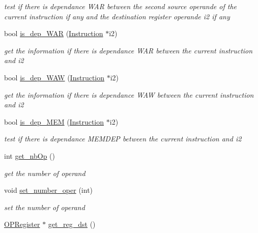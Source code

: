 \begin{DoxyCompactItemize}
\begin{DoxyCompactList}\small\item\em test if there is dependance \-W\-A\-R between the second source operande of the current instruction if any and the destination register operande i2 if any \end{DoxyCompactList}\item 
bool \hyperlink{classInstruction_ae79b239c6ab30a15064b5a00944ad65a}{is\-\_\-dep\-\_\-\-W\-A\-R} (\hyperlink{classInstruction}{\-Instruction} $\ast$i2)
\begin{DoxyCompactList}\small\item\em get the information if there is dependance \-W\-A\-R between the current instruction and i2 \end{DoxyCompactList}\item 
bool \hyperlink{classInstruction_a30c159faa5c462bb2c7ae7562c9c8254}{is\-\_\-dep\-\_\-\-W\-A\-W} (\hyperlink{classInstruction}{\-Instruction} $\ast$i2)
\begin{DoxyCompactList}\small\item\em get the information if there is dependance \-W\-A\-W between the current instruction and i2 \end{DoxyCompactList}\item 
bool \hyperlink{classInstruction_a28526bda91b964d7fd81f85cee02c624}{is\-\_\-dep\-\_\-\-M\-E\-M} (\hyperlink{classInstruction}{\-Instruction} $\ast$i2)
\begin{DoxyCompactList}\small\item\em test if there is dependance \-M\-E\-M\-D\-E\-P between the current instruction and i2 \end{DoxyCompactList}\item 
int \hyperlink{classInstruction_a044a281355f25375a7765f24bdf614f3}{get\-\_\-nb\-Op} ()
\begin{DoxyCompactList}\small\item\em get the number of operand \end{DoxyCompactList}\item 
\hypertarget{classInstruction_a6ff2d531dffa43d3db22194459336d33}{void \hyperlink{classInstruction_a6ff2d531dffa43d3db22194459336d33}{set\-\_\-number\-\_\-oper} (int)}\label{classInstruction_a6ff2d531dffa43d3db22194459336d33}

\begin{DoxyCompactList}\small\item\em set the number of operand \end{DoxyCompactList}\item 
\hypertarget{classInstruction_adb43e7019987daebb3970335aba695cc}{\hyperlink{classOPRegister}{\-O\-P\-Register} $\ast$ \hyperlink{classInstruction_adb43e7019987daebb3970335aba695cc}{get\-\_\-reg\-\_\-dst} ()}\label{classInstruction_adb43e7019987daebb3970335aba695cc}


\end{DoxyCompactItemize}
